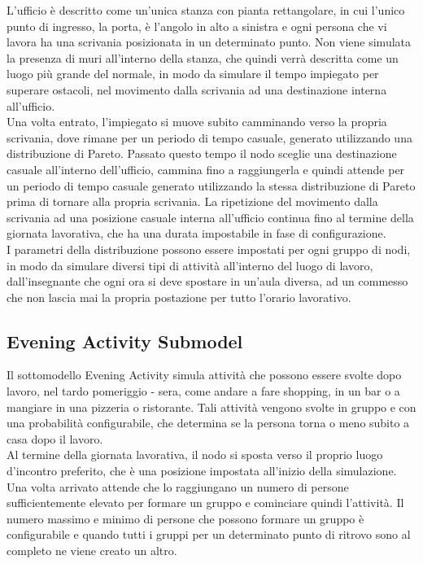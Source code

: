 L'ufficio è descritto come un'unica stanza con pianta rettangolare, in cui l'unico punto di ingresso, la porta, è l'angolo in alto a sinistra e ogni persona che vi lavora ha una scrivania posizionata in un determinato punto. Non viene simulata la presenza di muri all'interno della stanza, che quindi verrà descritta come un luogo più grande del normale, in modo da simulare il tempo impiegato per superare ostacoli, nel movimento dalla scrivania ad una destinazione interna all'ufficio.
\\

Una volta entrato, l'impiegato si muove subito camminando verso la propria scrivania, dove rimane per un periodo di tempo casuale, generato utilizzando una distribuzione di Pareto. Passato questo tempo il nodo sceglie una destinazione casuale all'interno dell'ufficio, cammina fino a raggiungerla e quindi attende per un periodo di tempo casuale generato utilizzando la stessa distribuzione di Pareto prima di tornare alla propria scrivania. La ripetizione del movimento dalla scrivania ad una posizione casuale interna all'ufficio continua fino al termine della giornata lavorativa, che ha una durata impostabile in fase di configurazione.
\\

I parametri della distribuzione possono essere impostati per ogni gruppo di nodi, in modo da simulare diversi tipi di attività all'interno del luogo di lavoro, dall'insegnante che ogni ora si deve spostare in un'aula diversa, ad un commesso che non lascia mai la propria postazione per tutto l'orario lavorativo.


\subsection{Evening Activity Submodel}
Il sottomodello Evening Activity simula attività che possono essere svolte dopo lavoro, nel tardo pomeriggio - sera, come andare a fare shopping, in un bar o a mangiare in una pizzeria o ristorante. Tali attività vengono svolte in gruppo e con una probabilità configurabile, che determina se la persona torna o meno subito a casa dopo il lavoro.
\\

Al termine della giornata lavorativa, il nodo si sposta verso il proprio luogo d'incontro preferito, che è una posizione impostata all'inizio della simulazione. Una volta arrivato attende che lo raggiungano un numero di persone sufficientemente elevato per formare un gruppo e cominciare quindi l'attività. Il numero massimo e minimo di persone che possono formare un gruppo è configurabile e quando tutti i gruppi per un determinato punto di ritrovo sono al completo ne viene creato un altro.
\\

